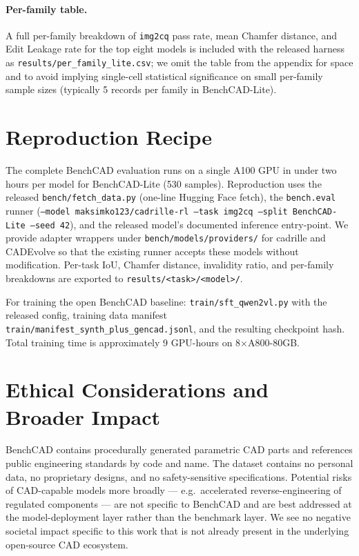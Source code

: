 \documentclass{article}
\begin{document}
\paragraph{Per-family table.} A full per-family breakdown of \texttt{img2cq} pass rate, mean Chamfer distance, and Edit Leakage rate for the top eight models is included with the released harness as \texttt{results/per\_family\_lite.csv}; we omit the table from the appendix for space and to avoid implying single-cell statistical significance on small per-family sample sizes (typically 5 records per family in BenchCAD-Lite).

\section{Reproduction Recipe}
\label{app:reproduce}

The complete BenchCAD evaluation runs on a single A100 GPU in under two hours per model for BenchCAD-Lite (530 samples). Reproduction uses the released \texttt{bench/fetch\_data.py} (one-line Hugging Face fetch), the \texttt{bench.eval} runner (\texttt{--model maksimko123/cadrille-rl --task img2cq --split BenchCAD-Lite --seed 42}), and the released model's documented inference entry-point. We provide adapter wrappers under \texttt{bench/models/providers/} for cadrille and CADEvolve so that the existing runner accepts these models without modification. Per-task IoU, Chamfer distance, invalidity ratio, and per-family breakdowns are exported to \texttt{results/<task>/<model>/}.

For training the open BenchCAD baseline: \texttt{train/sft\_qwen2vl.py} with the released config, training data manifest \texttt{train/manifest\_synth\_plus\_gencad.jsonl}, and the resulting checkpoint hash. Total training time is approximately 9 GPU-hours on 8$\times$A800-80GB.

\section{Ethical Considerations and Broader Impact}
\label{app:ethics}

BenchCAD contains procedurally generated parametric CAD parts and references public engineering standards by code and name. The dataset contains no personal data, no proprietary designs, and no safety-sensitive specifications. Potential risks of CAD-capable models more broadly --- e.g.\ accelerated reverse-engineering of regulated components --- are not specific to BenchCAD and are best addressed at the model-deployment layer rather than the benchmark layer. We see no negative societal impact specific to this work that is not already present in the underlying open-source CAD ecosystem.
\end{document}
